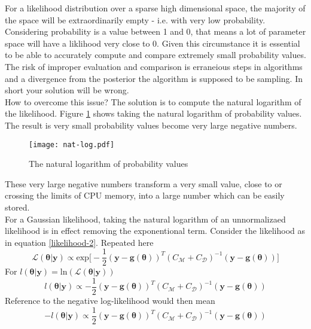 \begin{tcolorbox}

For a likelihood distribution over a sparse high dimensional space, the majority of the space will be extraordinarily empty - i.e. with very low probability. Considering probability is a value between 1 and 0, that means a lot of parameter space will have a liklihood very close to 0. Given this circumstance it is essential to be able to accurately compute and compare extremely small probability values. The risk of improper evaluation and comparison is erraneious steps in algorithms and a divergence from the posterior the algorithm is supposed to be sampling. In short your solution will be wrong. \\

How to overcome this issue? The solution is to compute the natural logarithm of the likelihood. Figure \ref{nat-log} shows taking the natural logarithm of probability values. The result is very small probability values become very large negative numbers.

\begin{figure}[H]
	\centering
	\texttt{[image: nat-log.pdf]}
	\caption{The natural logarithm of probability values}
	\label{nat-log}
\end{figure}

These very large negative numbers transform a very small value, close to or crossing the limits of CPU memory, into a large number which can be easily stored. \\

For a Gaussian likelihood, taking the natural logarithm of an unnormalizaed likelihood is in effect removing the exponentional term. Consider the likelihood as in equation \ref{likelihood-2}. Repeated here
\begin{equation}
\mathcal{L}(\bm{\theta}|\bm{y}) \propto \text{exp}\bigg[-\frac{1}{2}(\bm{y}-\bm{g}(\bm{\theta}))^T(C_{\mathcal{M}}+C_{\mathcal{D}})^{-1}(\bm{y}-\bm{g}(\bm{\theta}))\bigg]
\label{repeat-likelihood-2}
\end{equation}
For $l(\bm{\theta}|\bm{y}) = \text{ln}(\mathcal{L}(\bm{\theta}|\bm{y}))$
\begin{equation}
l(\bm{\theta}|\bm{y}) \propto -\frac{1}{2}(\bm{y}-\bm{g}(\bm{\theta}))^T(C_{\mathcal{M}}+C_{\mathcal{D}})^{-1}(\bm{y}-\bm{g}(\bm{\theta}))
\label{log-likelihood}
\end{equation}
Reference to the negative log-likelihood would then mean
\begin{equation}
-l(\bm{\theta}|\bm{y}) \propto \frac{1}{2}(\bm{y}-\bm{g}(\bm{\theta}))^T(C_{\mathcal{M}}+C_{\mathcal{D}})^{-1}(\bm{y}-\bm{g}(\bm{\theta}))
\label{negative-log-likelihood}
\end{equation}

\end{tcolorbox}

